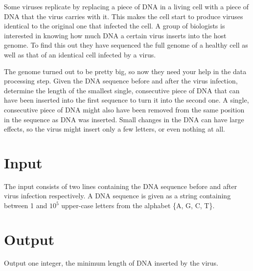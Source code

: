 
Some viruses replicate by replacing a piece of DNA in a living cell with a piece of DNA that the virus carries with it. This makes the cell start to produce viruses identical to the original one that infected the cell. A group of biologists is interested in knowing how much DNA a certain virus inserts into the host genome. To find this out they have sequenced the full genome of a healthy cell as well as that of an identical cell infected by a virus.

The genome turned out to be pretty big, so now they need your help in the data processing step. Given the DNA sequence before and after the virus infection, determine the length of the smallest single, consecutive piece of DNA that can have been inserted into the first sequence to turn it into the second one. A single, consecutive piece of DNA might also have been removed from the same position in the sequence as DNA was inserted. Small changes in the DNA can have large effects, so the virus might insert only a few letters, or even nothing at all.

\section*{Input}
The input consists of two lines containing the DNA sequence before and after virus infection
respectively. A DNA sequence is given as a string containing between 1 and $10^5$ upper-case letters
from the alphabet \{A, G, C, T\}.

\section*{Output}
Output one integer, the minimum length of DNA inserted by the virus.
